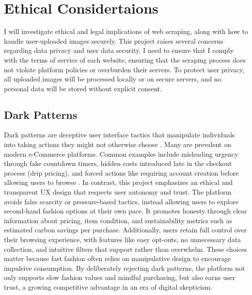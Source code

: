 \documentclass[10pt,twocolumn]{article}
\begin{document}
\section{Ethical Considertaions}
I will investigate ethical and legal implications of web scraping, along with how to handle user-uploaded images securely. This project raises several concerns regarding data privacy and user data security. I need to ensure that I comply with the terms of service of each website, ensuring that the scraping process does not violate platform policies or overburden their servers. To protect user privacy, all uploaded images will be processed locally or on secure servers, and no personal data will be stored without explicit consent.

\subsection{Dark Patterns}
Dark patterns are deceptive user interface tactics that manipulate individuals into taking actions they might not otherwise choose \cite{gray2018}. Many are prevalent on modern e-Commerce platforms. Common examples include misleading urgency through fake countdown timers, hidden costs introduced late in the checkout process (drip pricing), and forced actions like requiring account creation before allowing users to browse \cite{maier2020darkpatterns}. In contrast, this project emphasizes an ethical and transparent UX design that respects user autonomy and trust. The platform avoids false scarcity or pressure-based tactics, instead allowing users to explore second-hand fashion options at their own pace. It promotes honesty through clear information about pricing, item condition, and sustainability metrics such as estimated carbon savings per purchase. Additionally, users retain full control over their browsing experience, with features like easy opt-outs, no unnecessary data collection, and intuitive filters that support rather than overwhelm. These choices matter because fast fashion often relies on manipulative design to encourage impulsive consumption. By deliberately rejecting dark patterns, the platform not only supports slow fashion values and mindful purchasing, but also earns user trust, a growing competitive advantage in an era of digital skepticism. 
\end{document}

